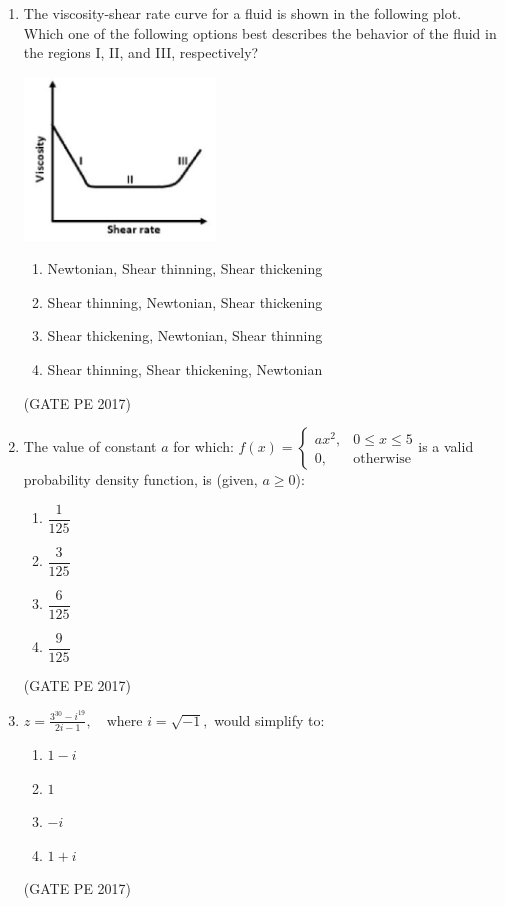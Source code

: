 \documentclass[journal,12pt,onecolumn]{IEEEtran}
\theoremstyle{remark}
\begin{document}
\begin{enumerate}[start=1, label={Q\arabic*.}]
\item The viscosity-shear rate curve for a fluid is shown in the following plot. Which one of the following options best describes the behavior of the fluid in the regions I, II, and III, respectively?
\begin{center}
    \includegraphics[width=0.4\textwidth]{Figs/Graph_Q41.png}
\end{center}
\begin{enumerate}
\item Newtonian, Shear thinning, Shear thickening
\item Shear thinning, Newtonian, Shear thickening
\item Shear thickening, Newtonian, Shear thinning
\item Shear thinning, Shear thickening, Newtonian
\end{enumerate}
\hfill{(GATE PE 2017)}

\item The value of constant $a$ for which:
$ f(x) = \begin{cases}ax^2, & 0 \leq x \leq 5 \\0, & \text{otherwise}
\end{cases}$is a valid probability density function, is (given, $a \geq 0$):
\begin{enumerate}
\item $\dfrac{1}{125}$
\item $\dfrac{3}{125}$
\item $\dfrac{6}{125}$
\item $\dfrac{9}{125}$
\end{enumerate}
\hfill{(GATE PE 2017)}

\item $z = \frac{3^{30} - i^{19}}{2i - 1}, \quad \text{where } i = \sqrt{-1},$ would simplify to:
\begin{enumerate}
\item $1 - i$
\item $1$
\item $-i$
\item $1 + i$
\end{enumerate}
\hfill{(GATE PE 2017)}


\end{enumerate}
\end{document}
